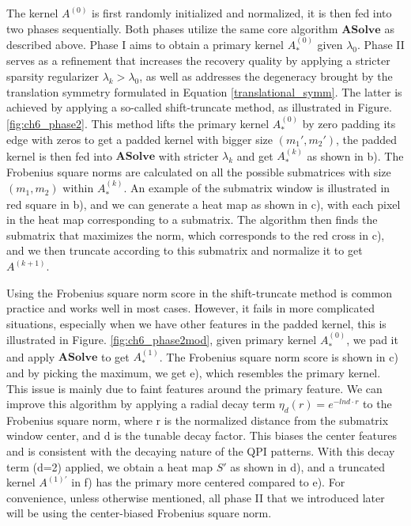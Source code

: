The kernel $A^{(0)}$ is first randomly initialized and normalized, it is then fed into two phases sequentially. Both phases utilize the same core algorithm $\mathbf{ASolve}$ as described above. Phase I aims to obtain a primary kernel $A^{(0)}_*$ given $\lambda_0$. Phase II serves as a refinement that increases the recovery quality by applying a stricter sparsity regularizer $\lambda_{k} > \lambda_0$, as well as addresses the degeneracy brought by the translation symmetry formulated in Equation \ref{translational_symm}. The latter is achieved by applying a so-called shift-truncate method, as illustrated in Figure. \ref{fig:ch6_phase2}. This method lifts the primary kernel $A^{(0)}_*$ by zero padding its edge with zeros to get a padded kernel with bigger size $(m_1',m_2')$, the padded kernel is then fed into $\mathbf{ASolve}$ with stricter $\lambda_{k}$ and get $A^{(k)}_*$ as shown in b). The Frobenius square norms are calculated on all the possible submatrices with size $(m_1,m_2)$ within $A^{(k)}_*$. An example of the submatrix window is illustrated in red square in b), and we can generate a heat map as shown in c), with each pixel in the heat map corresponding to a submatrix. The algorithm then finds the submatrix that maximizes the norm, which corresponds to the red cross in c), and we then truncate according to this submatrix and normalize it to get $A^{(k+1)}$. 

Using the Frobenius square norm score in the shift-truncate method is common practice and works well in most cases. However, it fails in more complicated situations, especially when we have other features in the padded kernel, this is illustrated in Figure. \ref{fig:ch6_phase2mod}, given primary kernel $A^{(0)}_*$, we pad it and apply $\mathbf{ASolve}$ to get $A^{(1)}_*$. The Frobenius square norm score is shown in c) and by picking the maximum, we get e), which resembles the primary kernel. This issue is mainly due to faint features around the primary feature. We can improve this algorithm by applying a radial decay term $\eta_d(r) = e^{-lnd \cdot r}$ to the Frobenius square norm, where r is the normalized distance from the submatrix window center, and d is the tunable decay factor. This biases the center features and is consistent with the decaying nature of the QPI patterns. With this decay term (d=2) applied, we obtain a heat map $S'$ as shown in d), and a truncated kernel $A^{(1)'}$ in f) has the primary more centered compared to e). For convenience, unless otherwise mentioned, all phase II that we introduced later will be using the center-biased Frobenius square norm. 

